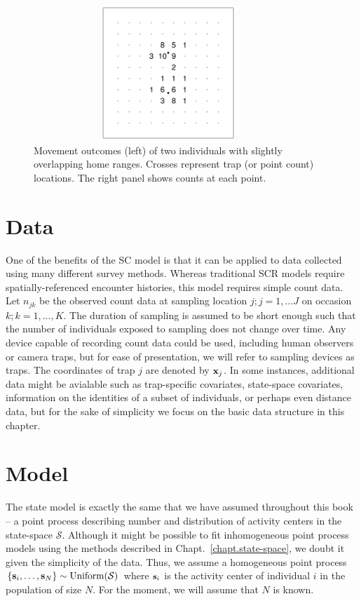 \begin{figure}
\centering
\includegraphics[width=4in,height=2in]{Ch18-Unmarked/figs/heuristic}
\caption{Movement outcomes (left) of two individuals with slightly
  overlapping home ranges. Crosses represent trap (or point count)
  locations. The right panel shows counts at each point.} %
\label{ch14.fig.heur}
\end{figure}


\section{Data}

One of the benefits of the SC model is that it
can be applied to data collected using many different survey
methods. Whereas traditional SCR models require spatially-referenced
encounter histories, this model requires simple count data.
Let $n_{jk}$ be the observed count data at sampling location $j;
j=1,\ldots J$ on occasion $k; k=1,\ldots,K$. The duration of sampling
is assumed to be short enough such that the number of individuals
exposed to sampling does not change over time. Any device capable of
recording count data could be used, including human observers or
camera traps, but for ease of presentation, we will refer to sampling
devices as traps. The coordinates of trap $j$ are denoted by ${\bf
  x}_j$. In some instances, additional data might be avialable such as
trap-specific covariates, state-space covariates,
information on the identities of a subset of individuals, or perhaps
even distance data, but for the sake of simplicity we focus on the
basic data structure in this chapter.

\section{Model}

The state model is exactly the same that we have assumed throughout
this book -- a point process describing number and distribution of
activity centers in the state-space $\mathcal{S}$. Although it might
be possible to fit inhomogeneous point process models using the
methods described in Chapt.~\ref{chapt.state-space}, we doubt it given
the simplicity of the data. Thus, we assume a homogeneous point process
$\{{\bf s}_i, \ldots, {\bf s}_N\} \sim \text{Uniform}(\mathcal{S})$
where ${\bf s}_i$ is the activity center of individual $i$ in the
population of size $N$. For the moment, we will assume that $N$ is
known.

